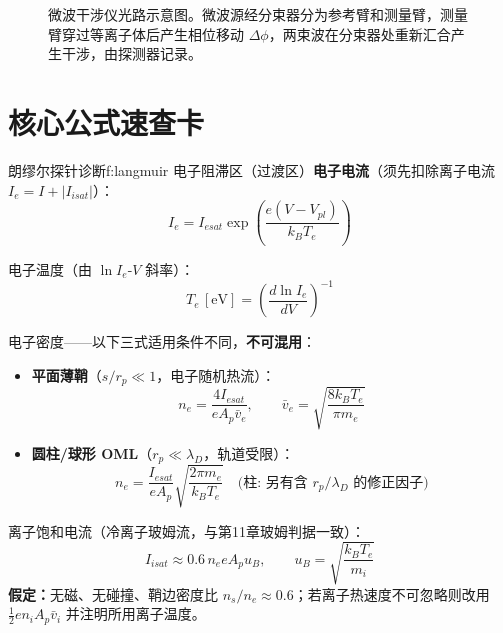 \begin{figure}[htbp]
    \caption{微波干涉仪光路示意图。微波源经分束器分为参考臂和测量臂，测量臂穿过等离子体后产生相位移动 $\Delta\phi$，两束波在分束器处重新汇合产生干涉，由探测器记录。}
    \label{fig:interferometer}
\end{figure}


\section{核心公式速查卡}

\begin{formulabox}{朗缪尔探针诊断}{f:langmuir}
电子阻滞区（过渡区）\textbf{电子电流}（须先扣除离子电流 $I_e = I + |I_{isat}|$）：
\[
    I_e = I_{esat} \exp\left(\frac{e(V - V_{pl})}{k_B T_e}\right)
\]

电子温度（由 $\ln I_e$-$V$ 斜率）：
\[
    T_e\,[\mathrm{eV}] = \left(\frac{d\ln I_e}{dV}\right)^{-1}
\]

电子密度——以下三式适用条件不同，\textbf{不可混用}：
\begin{itemize}
    \item \textbf{平面薄鞘}（$s/r_p\ll1$，电子随机热流）：
    \[
        n_e = \frac{4 I_{esat}}{e A_p \bar v_e},\qquad \bar v_e = \sqrt{\frac{8k_BT_e}{\pi m_e}}
    \]
    \item \textbf{圆柱/球形 OML}（$r_p\ll\lambda_D$，轨道受限）：
    \[
        n_e = \frac{I_{esat}}{e A_p}\sqrt{\frac{2\pi m_e}{k_B T_e}}
        \quad\text{(柱: 另有含 } r_p/\lambda_D \text{ 的修正因子)}
    \]
\end{itemize}

离子饱和电流（冷离子玻姆流，与第11章玻姆判据一致）：
\[
    I_{isat} \approx 0.6\, n_e e A_p u_B,\qquad u_B = \sqrt{\frac{k_B T_e}{m_i}}
\]
\textbf{假定：}无磁、无碰撞、鞘边密度比 $n_s/n_e \approx 0.6$；若离子热速度不可忽略则改用 $\frac12 en_iA_p\bar v_i$ 并注明所用离子温度。
\end{formulabox}

